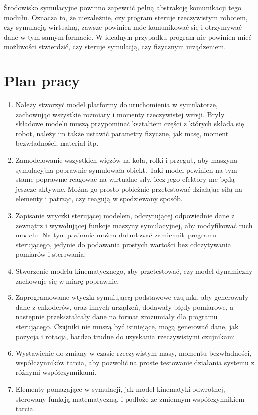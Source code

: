 		Środowisko symulacyjne powinno zapewnić pełną abstrakcję komunikacji tego modułu.
		Oznacza to, że niezależnie, czy program steruje rzeczywistym robotem, czy symulacją wirtualną, zawsze powinien móc komunikować się i otrzymywać dane w tym samym formacie.
		W idealnym przypadku program nie powinien mieć możliwości stwierdzić, czy steruje symulacją, czy fizycznym urządzeniem.
		
\section{Plan pracy}
	\begin{enumerate}
	\item Należy stworzyć model platformy do uruchomienia w symulatorze, zachowując wszystkie rozmiary i momenty rzeczywistej wersji.
	Bryły składowe modelu muszą przypominać kształtem części z których składa się robot, należy im także ustawić parametry fizyczne, jak masę, moment bezwładności, materiał itp.
	\item Zamodelowanie wszystkich więzów na koła, rolki i przegub, aby maszyna symulacyjna poprawnie symulowała obiekt.
	Taki model powinien na tym stanie poprawnie reagować na wirtualne siły, lecz jego efektory nie będą jeszcze aktywne.
	Można go prosto pobieżnie przetestować działając siłą na elementy i patrząc, czy reagują w spodziewany sposób.
	\item Zapisanie wtyczki sterującej modelem, odczytującej odpowiednie dane z zewnątrz i wywołującej funkcje maszyny symulacyjnej, aby modyfikować ruch modelu.
	Na tym poziomie można dobudować zamiennik programu sterującego, jedynie do podawania prostych wartości bez odczytywania pomiarów i sterowania.
	\item Stworzenie modelu kinematycznego, aby przetestować, czy model dynamiczny zachowuje się w miarę poprawnie.
	\item Zaprogramowanie wtyczki symulującej podstawowe czujniki, aby generowały dane z enkoderów, oraz innych urządzeń, dodawały błędy pomiarowe, a następnie przekształcały dane na format zrozumiały dla programu sterującego.
	Czujniki nie muszą być istniejące, mogą generować dane, jak pozycja i rotacja, bardzo trudne do uzyskania rzeczywistymi czujnikami.
	\item Wystawienie do zmiany w czasie rzeczywistym masy, momentu bezwładności, współczynników tarcia, aby pozwolić na proste testowanie działania systemu z różnymi współczynnikami.
	\item Elementy pomagające w symulacji, jak model kinematyki odwrotnej, sterowany funkcją matematyczną, i podłoże ze zmiennym współczynnikiem tarcia.

\end{enumerate}
